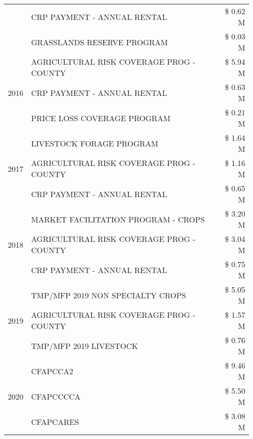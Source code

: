 \begin{tabular}{llr}
 & CRP PAYMENT - ANNUAL RENTAL & \$ 0.62 M \\
 & GRASSLANDS RESERVE PROGRAM & \$ 0.03 M \\
\cline{1-3}
\multirow[t]{3}{*}{2016} & AGRICULTURAL RISK COVERAGE PROG - COUNTY & \$ 5.94 M \\
 & CRP PAYMENT - ANNUAL RENTAL & \$ 0.63 M \\
 & PRICE LOSS COVERAGE PROGRAM & \$ 0.21 M \\
\cline{1-3}
\multirow[t]{3}{*}{2017} & LIVESTOCK FORAGE PROGRAM & \$ 1.64 M \\
 & AGRICULTURAL RISK COVERAGE PROG - COUNTY & \$ 1.16 M \\
 & CRP PAYMENT - ANNUAL RENTAL & \$ 0.65 M \\
\cline{1-3}
\multirow[t]{3}{*}{2018} & MARKET FACILITATION PROGRAM - CROPS & \$ 3.20 M \\
 & AGRICULTURAL RISK COVERAGE PROG - COUNTY & \$ 3.04 M \\
 & CRP PAYMENT - ANNUAL RENTAL & \$ 0.75 M \\
\cline{1-3}
\multirow[t]{3}{*}{2019} & TMP/MFP 2019 NON SPECIALTY CROPS & \$ 5.05 M \\
 & AGRICULTURAL RISK COVERAGE PROG - COUNTY & \$ 1.57 M \\
 & TMP/MFP 2019 LIVESTOCK & \$ 0.76 M \\
\cline{1-3}
\multirow[t]{3}{*}{2020} & CFAPCCA2 & \$ 9.46 M \\
 & CFAPCCCCA & \$ 5.50 M \\
 & CFAPCARES & \$ 3.08 M \\
\cline{1-3}
\bottomrule
\end{tabular}
